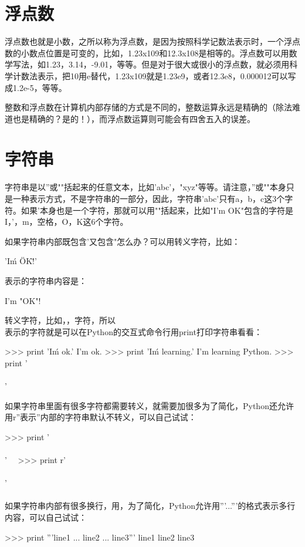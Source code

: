 \section{浮点数}
浮点数也就是小数，之所以称为浮点数，是因为按照科学记数法表示时，一个浮点数的小数点位置是可变的，比如，1.23x109和12.3x108是相等的。浮点数可以用数学写法，如1.23，3.14，-9.01，等等。但是对于很大或很小的浮点数，就必须用科学计数法表示，把10用e替代，1.23x109就是1.23e9，或者12.3e8，0.000012可以写成1.2e-5，等等。

整数和浮点数在计算机内部存储的方式是不同的，整数运算永远是精确的（除法难道也是精确的？是的！），而浮点数运算则可能会有四舍五入的误差。
\section{字符串}
字符串是以''或""括起来的任意文本，比如'abc'，"xyz"等等。请注意，''或""本身只是一种表示方式，不是字符串的一部分，因此，字符串'abc'只有a，b，c这3个字符。如果'本身也是一个字符，那就可以用""括起来，比如"I'm OK"包含的字符是I，'，m，空格，O，K这6个字符。

如果字符串内部既包含'又包含"怎么办？可以用转义字符，比如：

'I\'m \"OK\"!'

表示的字符串内容是：

I'm "OK"!

转义字符，比如，，字符，所以\\表示的字符就是\，可以在Python的交互式命令行用print打印字符串看看：

>>> print 'I\'m ok.'
I'm ok.
>>> print 'I\'m learning\nPython.'
I'm learning
Python.
>>> print '\\\n\\'
\
\

如果字符串里面有很多字符都需要转义，就需要加很多\，为了简化，Python还允许用r''表示''内部的字符串默认不转义，可以自己试试：

>>> print '\\\t\\'
\       \
>>> print r'\\\t\\'
\\\t\\

如果字符串内部有很多换行，用，为了简化，Python允许用'''...'''的格式表示多行内容，可以自己试试：

>>> print '''line1
... line2
... line3'''
line1
line2
line3

